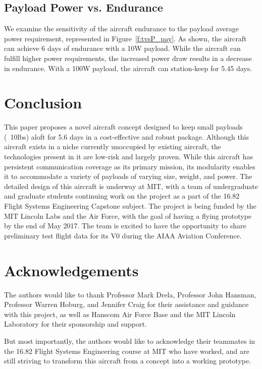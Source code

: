 \documentclass[journal]{aiaa-tc}%
\begin{document}
\subsection{Payload Power vs. Endurance}

We examine the sensitivity of the aircraft endurance to the payload average power requirement, represented in Figure~\ref{f:tvsP_pay}. As shown, the aircraft can achieve 6 days of endurance with a 10W payload. While the aircraft can fulfill higher power requirements, the increased power draw results in a decrease in endurance. With a 100W payload, the aircraft can station-keep for 5.45 days. 

\section{Conclusion}

This paper proposes a novel aircraft concept designed to keep small payloads (~10lbs) aloft for 5.6 days in a cost-effective and robust package. Although this aircraft exists in a niche currently unoccupied by existing aircraft, the technologies present in it are low-risk and largely proven. While this aircraft has persistent communication coverage as its primary mission, its modularity enables it to accommodate a variety of payloads of varying size, weight, and power. The detailed design of this aircraft is underway at MIT, with a team of undergraduate and graduate students continuing work on the project as a part of the 16.82 Flight Systems Engineering Capstone subject. The project is being funded by the MIT Lincoln Labs and the Air Force, with the goal of having a flying prototype by the end of May 2017. The team is excited to have the opportunity to share preliminary test flight data for its V0 during the AIAA Aviation Conference. 

\section{Acknowledgements}

The authors would like to thank Professor Mark Drela, Professor John Hansman, Professor Warren Hoburg, and Jennifer Craig for their assistance and guidance with this project, as well as Hanscom Air Force Base and the MIT Lincoln Laboratory for their sponsorship and support. 

But most importantly, the authors would like to acknowledge their teammates in the 16.82 Flight Systems Engineering course at MIT who have worked, and are still striving to transform this aircraft from a concept into a working prototype. 
\end{document}
